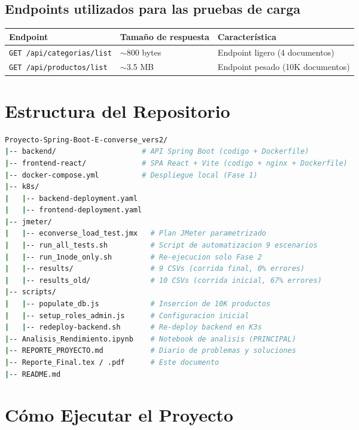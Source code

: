 \documentclass[11pt,a4paper]{article}
\begin{document}
\subsection{Endpoints utilizados para las pruebas de carga}

\begin{center}
\begin{tabular}{lll}
\toprule
\textbf{Endpoint} & \textbf{Tamaño de respuesta} & \textbf{Característica} \\
\midrule
\texttt{GET /api/categorias/list} & $\sim$800 bytes & Endpoint ligero (4 documentos) \\
\texttt{GET /api/productos/list} & $\sim$3.5 MB & Endpoint pesado (10K documentos) \\
\bottomrule
\end{tabular}
\end{center}

\section{Estructura del Repositorio}

\begin{lstlisting}[language=bash]
Proyecto-Spring-Boot-E-converse_vers2/
|-- backend/                    # API Spring Boot (codigo + Dockerfile)
|-- frontend-react/             # SPA React + Vite (codigo + nginx + Dockerfile)
|-- docker-compose.yml          # Despliegue local (Fase 1)
|-- k8s/
|   |-- backend-deployment.yaml
|   |-- frontend-deployment.yaml
|-- jmeter/
|   |-- econverse_load_test.jmx   # Plan JMeter parametrizado
|   |-- run_all_tests.sh          # Script de automatizacion 9 escenarios
|   |-- run_1node_only.sh         # Re-ejecucion solo Fase 2
|   |-- results/                  # 9 CSVs (corrida final, 0% errores)
|   |-- results_old/              # 10 CSVs (corrida inicial, 67% errores)
|-- scripts/
|   |-- populate_db.js            # Insercion de 10K productos
|   |-- setup_roles_admin.js      # Configuracion inicial
|   |-- redeploy-backend.sh       # Re-deploy backend en K3s
|-- Analisis_Rendimiento.ipynb    # Notebook de analisis (PRINCIPAL)
|-- REPORTE_PROYECTO.md           # Diario de problemas y soluciones
|-- Reporte_Final.tex / .pdf      # Este documento
|-- README.md
\end{lstlisting}

\section{Cómo Ejecutar el Proyecto}
\end{document}
